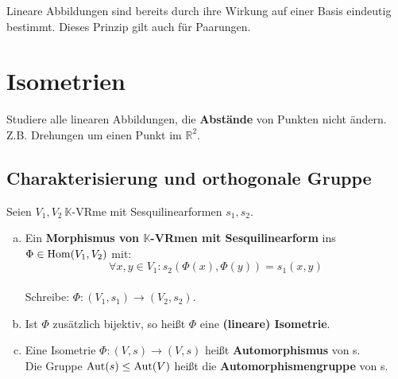 \documentclass[parskip,a4paper,twoside,DIV15,BCOR12mm]{scrbook}
\begin{document}
\begin{remind}
Lineare Abbildungen sind bereits durch ihre Wirkung auf einer Basis eindeutig
bestimmt. Dieses Prinzip gilt auch für Paarungen.
\end{remind}

\begin{comment}
\index{bilineare!Fortsetzung}\index{Fortsetzung!bilineare}
Seien $V,W$ $K$-VRme mit jeweiliger Basis $B:=\{b_1,\ldots,b_m\}\subseteq V,
C:=\{c_1,\ldots,c_n\}\subseteq W$, so ist eine Paarung $P$ auf $V\times W$
Bereits durch ihre Einschränkung auf $B\times C$ festgelegt.\\
Für $v:=\sum_{i=1}^m \alpha_i b_i,w:=\sum_{j=1}^n \beta_j c_j$ gilt:
\[P(v,w)=\sum_{i=1}^m\sum_{j=1}^n \alpha_i\beta_j\cdot P(b_i,c_j)\]
Jede Abbildung $P':B\times C\to K$ definiert über diese Gleichung eine Paarung
$P':V\times W\to K$. Diese heißt \textbf{bilineare Fortsetzung}.
\end{comment}

\setcounter{chapter}{18}
\chapter{Isometrien}

\begin{task}
Studiere alle linearen Abbildungen, die \textbf{Abstände} von Punkten nicht ändern.
Z.B. Drehungen um einen Punkt im $\mathbb{R}^2$.
\end{task}

\section{Charakterisierung und orthogonale Gruppe}
\begin{definition}
Seien $V_1,V_2\ \mathbb{K}$-VRme mit Sesquilinearformen $s_1,s_2$.
\begin{enumerate}[(a)]
\item Ein \textbf{Morphismus von $\mathbb{K}$-VRmen mit Sesquilinearform} ins
$\Phi\in \operatorname{Hom}(V_1,V_2)$ mit:\\
\[\forall x,y\in V_1:s_2(\Phi(x),\Phi(y))=s_1(x,y)\]\\
Schreibe: $\Phi:(V_1,s_1)\to (V_2,s_2)$.
\item Ist $\Phi$ zusätzlich bijektiv, so heißt $\Phi$ eine \textbf{(lineare) Isometrie}.
\item Eine Isometrie $\Phi:(V,s)\to (V,s)$ heißt \textbf{Automorphismus} von s.\\
Die Gruppe $\operatorname{Aut}(s)\le\operatorname{Aut}(V)$ heißt die \textbf{Automorphismengruppe} von s.
\end{enumerate}
\end{definition}
\end{document}
